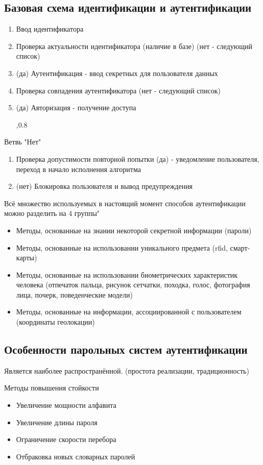 \documentclass[a4paper,12pt]{report}
\begin{document}
\subsection{Базовая схема идентификации и аутентификации}
		\begin{enumerate}
			\item	Ввод идентификатора
			\item	Проверка актуальности идентификатора (наличие в базе) (нет - следующий список)
			\item	(да) Аутентификация - ввод секретных для пользователя данных
			\item	Проверка совпадения аутентификатора (нет - следующий список)
			\item	(да) Авторизация - получение доступа		

		,0.8

		\end{enumerate}
		Ветвь "Нет"
		\begin{enumerate}
			\item Проверка допустимости повторной попытки (да) - уведомление пользователя, переход в начало исполнения алгоритма
			\item (нет) Блокировка пользователя и вывод предупреждения
		\end{enumerate}
		Всё множество используемых в настоящий момент способов аутентификации можно разделить на 4 группы"
	\begin{itemize}
		\item	Методы, основанные на знании некоторой секретной информации (пароли)
		\item	Методы, основанные на использовании уникального предмета (rfid, смарт-карты)
		\item	Методы, основанные на использовании биометрических характеристик человека (отпечаток пальца, рисунок сетчатки, походка, голос, фотография лица, почерк, поведенческие модели)
		\item	Методы, основанные на информации, ассоциированной с пользователем (координаты геолокации)
	\end{itemize}
	
	\subsection{Особенности парольных систем аутентификации}
		Является наиболее распространённой. (простота реализации, традиционность)
		
		Методы повышения стойкости
		\begin{itemize}
			\item	Увеличение мощности алфавита
			\item	Увеличение длины пароля
			\item	Ограничение скорости перебора
			\item	Отбраковка новых словарных паролей
		\end{itemize}
		
\end{document}

